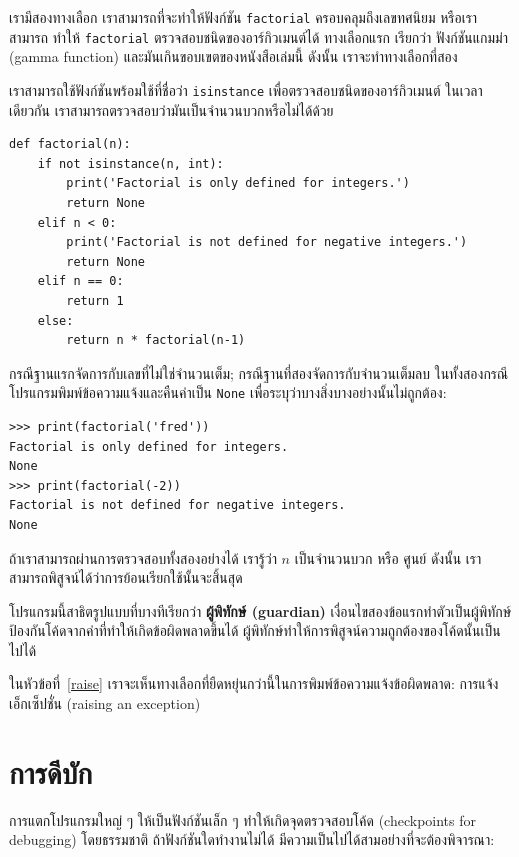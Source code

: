 เรามีสองทางเลือก เราสามารถที่จะทำให้ฟังก์ชัน {\tt factorial} ครอบคลุมถึงเลขทศนิยม หรือเราสามารถ
ทำให้ {\tt factorial} ตรวจสอบชนิดของอาร์กิวเมนต์ได้ ทางเลือกแรก เรียกว่า ฟังก์ชันแกมม่า (gamma function)
และมันเกินขอบเขตของหนังสือเล่มนี้ ดังนั้น เราจะทำทางเลือกที่สอง

เราสามารถใช้ฟังก์ชันพร้อมใช้ที่ชื่อว่า {\tt isinstance} เพื่อตรวจสอบชนิดของอาร์กิวเมนต์ ในเวลาเดียวกัน
เราสามารถตรวจสอบว่ามันเป็นจำนวนบวกหรือไม่ได้ด้วย

\begin{verbatim}
def factorial(n):
    if not isinstance(n, int):
        print('Factorial is only defined for integers.')
        return None
    elif n < 0:
        print('Factorial is not defined for negative integers.')
        return None
    elif n == 0:
        return 1
    else:
        return n * factorial(n-1)
\end{verbatim}
%
กรณีฐานแรกจัดการกับเลขที่ไม่ใช่จำนวนเต็ม; กรณีฐานที่สองจัดการกับจำนวนเต็มลบ ในทั้งสองกรณี
โปรแกรมพิมพ์ข้อความแจ้งและคืนค่าเป็น {\tt None} เพื่อระบุว่าบางสิ่งบางอย่างนั้นไม่ถูกต้อง:

\begin{verbatim}
>>> print(factorial('fred'))
Factorial is only defined for integers.
None
>>> print(factorial(-2))
Factorial is not defined for negative integers.
None
\end{verbatim}
% 
ถ้าเราสามารถผ่านการตรวจสอบทั้งสองอย่างได้ เรารู้ว่า {\scriptsize$n$} เป็นจำนวนบวก หรือ ศูนย์
ดังนั้น เราสามารถพิสูจน์ได้ว่าการย้อนเรียกใช้นั้นจะสิ้นสุด

โปรแกรมนี้สาธิตรูปแบบที่บางทีเรียกว่า {\bf ผู้พิทักษ์ (guardian)} 
เงื่อนไขสองข้อแรกทำตัวเป็นผู้พิทักษ์ป้องกันโค้ดจากค่าที่ทำให้เกิดข้อผิดพลาดขึ้นได้ ผู้พิทักษ์ทำให้การพิสูจน์ความถูกต้องของโค้ดนั้นเป็นไปได้

ในหัวข้อที่~\ref{raise} เราจะเห็นทางเลือกที่ยืดหยุ่นกว่านี้ในการพิมพ์ข้อความแจ้งข้อผิดพลาด: 
การแจ้งเอ็กเซ็ปชั่น (raising an exception)


\section{การดีบัก}
\label{factdebug}

การแตกโปรแกรมใหญ่ ๆ ให้เป็นฟังก์ชันเล็ก ๆ ทำให้เกิดจุดตรวจสอบโค้ด (checkpoints for debugging) โดยธรรมชาติ
ถ้าฟังก์ชันใดทำงานไม่ได้ มีความเป็นไปได้สามอย่างที่จะต้องพิจารณา:

